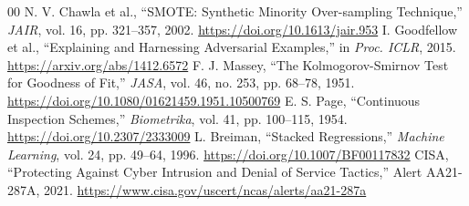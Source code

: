\documentclass[conference]{IEEEtran}
\begin{document}
\begin{thebibliography}{00}
 N. V. Chawla et al., ``SMOTE: Synthetic Minority Over-sampling Technique,'' \emph{JAIR}, vol. 16, pp. 321--357, 2002. \url{https://doi.org/10.1613/jair.953}
 I. Goodfellow et al., ``Explaining and Harnessing Adversarial Examples,'' in \emph{Proc. ICLR}, 2015. \url{https://arxiv.org/abs/1412.6572}
 F. J. Massey, ``The Kolmogorov-Smirnov Test for Goodness of Fit,'' \emph{JASA}, vol. 46, no. 253, pp. 68--78, 1951. \url{https://doi.org/10.1080/01621459.1951.10500769}
 E. S. Page, ``Continuous Inspection Schemes,'' \emph{Biometrika}, vol. 41, pp. 100--115, 1954. \url{https://doi.org/10.2307/2333009}
 L. Breiman, ``Stacked Regressions,'' \emph{Machine Learning}, vol. 24, pp. 49--64, 1996. \url{https://doi.org/10.1007/BF00117832}
 CISA, ``Protecting Against Cyber Intrusion and Denial of Service Tactics,'' Alert AA21-287A, 2021. \url{https://www.cisa.gov/uscert/ncas/alerts/aa21-287a}
\end{thebibliography}
\end{document}
